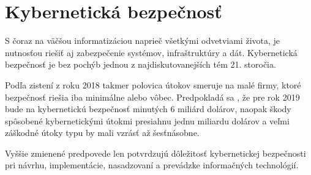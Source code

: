 \chapter{Kybernetická bezpečnosť}

S čoraz na väčšou informatizáciou naprieč všetkými odvetviami života, je nutnosťou riešiť aj zabezpečenie systémov, infraštruktúry a dát. Kybernetická bezpečnosť je bez pochýb jednou z najdiskutovanejších tém 21. storočia.
 
Podľa zistení z roku 2018 \cite{Milkovich3122018} takmer polovica útokov smeruje na malé firmy, ktoré bezpečnosť riešia iba minimálne alebo vôbec. Predpokladá sa \cite{Milkovich3122018}, že pre rok 2019 bude na kybernetickú bezpečnosť minutých 6 miliárd dolárov, naopak škody spôsobené kybernetickými útokmi presiahnu jednu miliardu dolárov a veľmi záškodné útoky typu  by mali vzrásť až šesťnásobne. 

Vyššie zmienené predpovede len potvrdzujú dôležitosť kybernetickej  bezpečnosti pri návrhu, implementácie, nasadzovaní a prevádzke informačných technológií.




